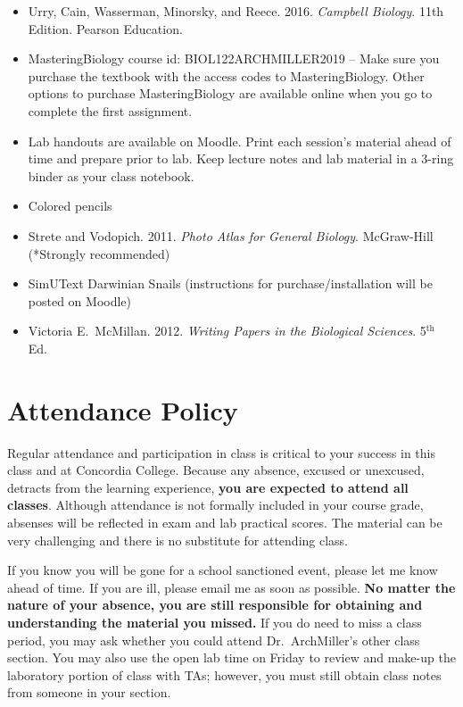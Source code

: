 \documentclass{tufte-handout}
\begin{document}
\begin{fullwidth}
\begin{itemize}
	\item Urry, Cain, Wasserman, Minorsky, and Reece. 2016. \emph{Campbell Biology}. 11th Edition. Pearson Education.
	\item MasteringBiology course id: BIOL122ARCHMILLER2019 -- Make sure you purchase the textbook with the access codes to MasteringBiology. Other options to purchase MasteringBiology are available online when you go to complete the first assignment. 
	\item Lab handouts are available on Moodle. Print each session's material ahead of time and prepare prior to lab. Keep lecture notes and lab material in a 3-ring binder as your class notebook. 
	\item Colored pencils
	\item Strete and Vodopich. 2011. \emph{Photo Atlas for General Biology}. McGraw-Hill (*Strongly recommended)
	\item SimUText Darwinian Snails (instructions for purchase/installation will be posted on Moodle)
	\item Victoria E.\ McMillan. 2012. \emph{Writing Papers in the Biological Sciences}. 5$^\mathrm{th}$ Ed.
\end{itemize}

\section{Attendance Policy}

Regular attendance and participation in class is critical to your success in this class and at Concordia College. Because any absence, excused or unexcused, detracts from the learning experience, \textbf{you are expected to attend all classes}. Although attendance is not formally included in your course grade, absenses will be reflected in exam and lab practical scores. The material can be very challenging and there is no substitute for attending class. 




If you know you will be gone for a school sanctioned event, please let me know ahead of time. If you are ill, please email me as soon as possible. \textbf{No matter the nature of your absence, you are still responsible for obtaining and understanding the material you missed.} If you do need to miss a class period, you may ask whether you could attend Dr.\ ArchMiller's other class section. You may also use the open lab time on Friday to review and make-up the laboratory portion of class with TAs; however, you must still obtain class notes from someone in your section.  


\end{fullwidth}
\end{document}
